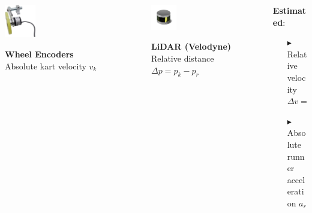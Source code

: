 \documentclass[9pt, aspectratio=169]{beamer}
\begin{document}
\begin{frame}[t]
\vspace{0.1cm}
\begin{columns}
\begin{column}{0.3\textwidth}
	\begin{center}
  		\includegraphics[width=0.23\textwidth]{Wheel_Encoder} 
	\end{center}
\centering
\textbf{Wheel Encoders} \\
Absolute kart velocity $v_k$
\end{column}

\begin{column}{0.3\textwidth}
	\begin{center}
  		\includegraphics[width=0.23\textwidth]{Lidar} 
	\end{center}
\centering
\textbf{LiDAR (Velodyne)} \\
Relative distance $\Delta p = p_k - p_r$
\end{column}

\begin{column}{0.4\textwidth}
\hspace{1.5cm} \textbf{Estimated}:
\begin{itemize}
	\footnotesize
	\item[$\blacktriangleright$] Relative velocity  $\Delta v = v_k - v_r$
	\item[$\blacktriangleright$] Absolute runner acceleration  $a_r$
\end{itemize}
\end{column}
\end{columns}
\end{frame}
\end{document}
